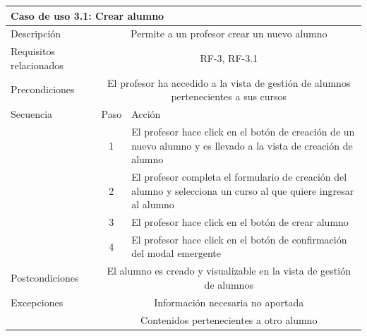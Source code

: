\hspace{3cm}

\begin{tabular}[H]{l c l}
\toprule 
\multicolumn{3}{l}{\textbf{Caso de uso 3.1: Crear alumno}}\\
\midrule
Descripción & \multicolumn{2}{p{10cm}}{Permite a un profesor crear un nuevo alumno}\\
\midrule
Requisitos relacionados & \multicolumn{2}{p{10cm}}{RF-3, RF-3.1}\\
\midrule
Precondiciones & \multicolumn{2}{p{10cm}}{El profesor ha accedido a la vista de gestión de alumnos pertenecientes a sus cursos}\\
\midrule
Secuencia & Paso & Acción \\
\cmidrule{2-3}
         & 1 &  \multicolumn{1}{p{8cm}}{El profesor hace click en el botón de creación de un nuevo alumno y es llevado a la vista de creación de alumno}\\
         & 2 &  \multicolumn{1}{p{8cm}}{El profesor completa el formulario de creación del alumno y selecciona un curso al que quiere ingresar al alumno}\\
         & 3 &  \multicolumn{1}{p{8cm}}{El profesor hace click en el botón de crear alumno}\\
         & 4 &  \multicolumn{1}{p{8cm}}{El profesor hace click en el botón de confirmación del modal emergente}\\

\midrule
Postcondiciones & \multicolumn{2}{p{10cm}}{El alumno es creado y visualizable en la vista de gestión de alumnos}\\
\midrule
Excepciones & \multicolumn{2}{p{10cm}}{Información necesaria no aportada}\\
            & \multicolumn{2}{p{10cm}}{Contenidos pertenecientes a otro alumno}\\
\bottomrule 
\end{tabular}

\hspace{3cm}

